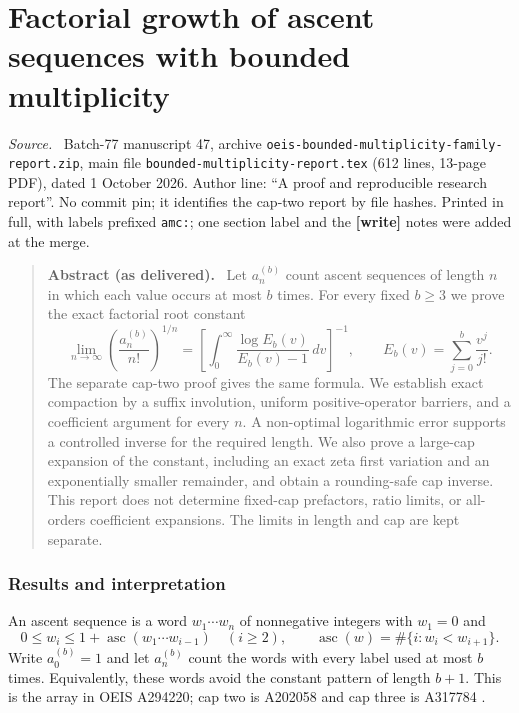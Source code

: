 \documentclass[11pt,letterpaper]{article}
\theoremstyle{remark}\newtheorem{remark}[theorem]{Remark}
\newcommand{\asc}{\operatorname{asc}}
\newenvironment{partsource}{\par\medskip\noindent\begin{minipage}{\linewidth}\small\raggedright\textit{Source.}\ }{\end{minipage}\par\medskip}
\newenvironment{partabstract}{\par\begin{quote}\small\textbf{Abstract (as delivered).}\ }{\end{quote}\par}
\begin{document}
\begin{itemize}
\end{itemize}

\cleardoublepage
\part{Factorial growth of ascent sequences with bounded multiplicity}\label{amc:part:fc}

\begin{partsource}
Batch-77 manuscript 47, archive \texttt{oeis-bounded-multiplicity-family-report.zip}, main file \texttt{bounded-multiplicity-report.tex} (612 lines, 13-page PDF), dated 1 October 2026. Author line: ``A proof and reproducible research report''. No commit pin; it identifies the cap-two report by file hashes. Printed in full, with labels prefixed \texttt{amc:}; one section label and the \textbf{[write]} notes were added at the merge.
\end{partsource}

\begin{partabstract}
Let $a_n^{(b)}$ count ascent sequences of length $n$ in which each value occurs at most $b$ times. For every fixed $b\ge3$ we prove the exact factorial root constant
\[
 \lim_{n\to\infty}\left(\frac{a_n^{(b)}}{n!}\right)^{1/n}
 =\left[\int_0^\infty\frac{\log E_b(v)}{E_b(v)-1}\,dv\right]^{-1},
 \qquad E_b(v)=\sum_{j=0}^b\frac{v^j}{j!}.
\]
The separate cap-two proof gives the same formula. We establish exact compaction by a suffix involution, uniform positive-operator barriers, and a coefficient argument for every $n$. A non-optimal logarithmic error supports a controlled inverse for the required length. We also prove a large-cap expansion of the constant, including an exact zeta first variation and an exponentially smaller remainder, and obtain a rounding-safe cap inverse. This report does not determine fixed-cap prefactors, ratio limits, or all-orders coefficient expansions. The limits in length and cap are kept separate.
\end{partabstract}

\section{Results and interpretation}\label{amc:sec:intro}
An ascent sequence is a word $w_1\cdots w_n$ of nonnegative integers with $w_1=0$ and
\[
 0\le w_i\le1+\asc(w_1\cdots w_{i-1})\quad(i\ge2),\qquad
 \asc(w)=\#\{i:w_i<w_{i+1}\}.
\]
Write $a_0^{(b)}=1$ and let $a_n^{(b)}$ count the words with every label used at most $b$ times. Equivalently, these words avoid the constant pattern of length $b+1$. This is the array in OEIS A294220; cap two is A202058 and cap three is A317784 \cite{array,cap3}.
\end{document}
